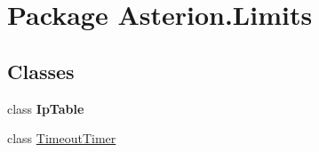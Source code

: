 \hypertarget{namespaceAsterion_1_1Limits}{\section{Package Asterion.\-Limits}
\label{namespaceAsterion_1_1Limits}
}
\subsection*{Classes}
\begin{DoxyCompactItemize}
\item 
class {\bfseries Ip\-Table}
\item 
class \hyperlink{classAsterion_1_1Limits_1_1TimeoutTimer}{Timeout\-Timer}
\end{DoxyCompactItemize}
